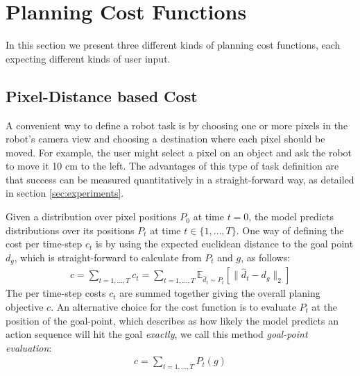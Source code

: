 \section{Planning Cost Functions}
\label{sec:cost}
In this section we present three different kinds of planning cost functions, each expecting different kinds of user input.


\subsection{Pixel-Distance based Cost}
\label{subsec:pixel_dist_cost}
A convenient way to define a robot task is by choosing one or more pixels in the robot's camera view and choosing a destination where each pixel should be moved. For example, the user might select a pixel on an object and ask the robot to move it 10 cm to the left. The advantages of this type of task definition are that success can be measured quantitatively in a straight-forward way, as detailed in section \ref{sec:experiments}.

 
Given a distribution over pixel positions $P_0$ at time $t = 0$, the model predicts distributions over its positions $P_t$ at time $t \in \{ 1, \dots, T \}$. One way of defining the cost per time-step $c_t$ is by using the expected euclidean distance to the goal point $d_g$, which is straight-forward to calculate from $P_t$ and $g$, as follows:
 \begin{align}
c = \sum_{t = 1, \dots, T} c_t =  \sum_{t = 1, \dots, T} \mathbb{E}_{\hat{d}_{t} \sim P_{t}} \left[\|\hat{d}_{t} - d_{g}\|_2\right] 
 \label{eq:cost}
 \end{align}
The per time-step costs $c_t$ are summed together giving the overall planing objective $c$. An alternative choice for the cost function is to evaluate $P_{t}$ at the position of the goal-point, which describes as how likely the model predicts an action sequence will hit the goal \emph{exactly}, we call this method \emph{goal-point evaluation}:
 \begin{align}
 c = \sum_{t = 1, \dots, T} P_t(g)
 \label{eq:goal_point_eval}
 \end{align}
 
